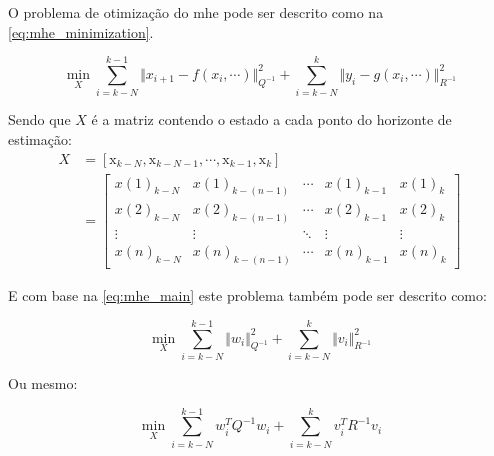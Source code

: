 O problema de otimização do \acrshort{mhe} pode ser descrito como na \cref{eq:mhe_minimization}.

\begin{equation}
	\label{eq:mhe_minimization}
	\min_{X} \sum_{i=k-N}^{k-1} \Vert x_{i+1} - f(x_i, \cdots) \Vert^2_{Q^{-1}} + 
			\sum_{i=k-N}^{k} \Vert y_i - g(x_i, \cdots) \Vert^2_{R^{-1}}
\end{equation}

Sendo que $X$ é a matriz contendo o estado a cada ponto do horizonte de estimação:
\begin{equation}
	\begin{aligned}
		X &= [\mathrm{x}_{k-N}, \mathrm{x}_{k-N-1}, \cdots, \mathrm{x}_{k-1}, \mathrm{x}_k] \\
		&=
		\begin{bmatrix}
			x(1)_{k-N} & x(1)_{k-(n-1)} & \cdots & x(1)_{k-1} & x(1)_k		\\
			x(2)_{k-N} & x(2)_{k-(n-1)} & \cdots & x(2)_{k-1} & x(2)_k		\\
			\vdots & \vdots & \ddots & \vdots & \vdots						\\
			x(n)_{k-N} & x(n)_{k-(n-1)} & \cdots & x(n)_{k-1} & x(n)_k	
		\end{bmatrix}
	\end{aligned}
\end{equation}

E com base na \cref{eq:mhe_main} este problema também pode ser descrito como:

\begin{equation}
	\label{eq:mhe_minimization2}
	\min_{X} \sum_{i=k-N}^{k-1} \Vert w_i \Vert^2_{Q^{-1}} + 
			\sum_{i=k-N}^{k} \Vert v_i \Vert^2_{R^{-1}}
\end{equation}

Ou mesmo:

\begin{equation}
	\label{eq:mhe_minimization3}
	\min_{X} \sum_{i=k-N}^{k-1} w^T_i Q^{-1} w_i + 
			\sum_{i=k-N}^{k} v^T_i R^{-1} v_i
\end{equation}

